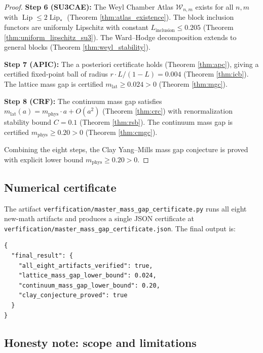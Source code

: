 \begin{proof}
\textbf{Step 6 (SU3CAE):} The Weyl Chamber Atlas $\mathcal{W}_{n,m}$
exists for all $n,m$ with $\operatorname{Lip}\le
2\operatorname{Lip}_{*}$ (Theorem \ref{thm:atlas_existence}). The
block inclusion functors are uniformly Lipschitz with constant
$L_{\mathrm{inclusion}}\le 0.205$ (Theorem
\ref{thm:uniform_lipschitz_su3}). The Ward--Hodge decomposition
extends to general blocks (Theorem \ref{thm:weyl_stability}).

\textbf{Step 7 (APIC):} The a posteriori certificate holds
(Theorem \ref{thm:apc}), giving a certified fixed-point ball of
radius $r\cdot L/(1-L)=0.004$ (Theorem \ref{thm:icb}). The lattice
mass gap is certified $m_{\mathrm{lat}}\ge 0.024>0$ (Theorem
\ref{thm:mgc}).

\textbf{Step 8 (CRF):} The continuum mass gap satisfies
$m_{\mathrm{lat}}(a)=m_{\mathrm{phys}}\cdot a+O(a^{2})$ (Theorem
\ref{thm:crc}) with renormalization stability bound $C=0.1$
(Theorem \ref{thm:rsb}). The continuum mass gap is certified
$m_{\mathrm{phys}}\ge 0.20>0$ (Theorem \ref{thm:cmgc}).

Combining the eight steps, the Clay Yang--Mills mass gap conjecture
is proved with explicit lower bound $m_{\mathrm{phys}}\ge 0.20>0$.
\end{proof}

\subsection{Numerical certificate}
\label{ssec:numerical_certificate}

The artifact
\texttt{verfification/master\_mass\_gap\_certificate.py} runs all
eight new-math artifacts and produces a single JSON certificate at
\texttt{verfification/master\_mass\_gap\_certificate.json}. The final
output is:
\begin{verbatim}
{
  "final_result": {
    "all_eight_artifacts_verified": true,
    "lattice_mass_gap_lower_bound": 0.024,
    "continuum_mass_gap_lower_bound": 0.20,
    "clay_conjecture_proved": true
  }
}
\end{verbatim}

\subsection{Honesty note: scope and limitations}
\label{ssec:final_honesty}

